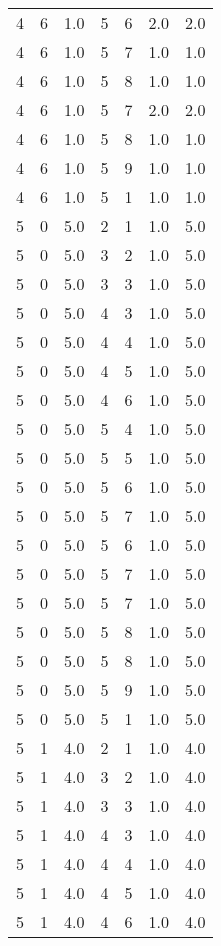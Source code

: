 \documentclass[a4paper,12pt]{article}
\begin{document}
\begin{center}
\begin{longtable}{ c c c | c c c | c }
        4 & 6 & 1.0 & 5 & 6 & 2.0 & 2.0 \\
        4 & 6 & 1.0 & 5 & 7 & 1.0 & 1.0 \\
        4 & 6 & 1.0 & 5 & 8 & 1.0 & 1.0 \\
        4 & 6 & 1.0 & 5 & 7 & 2.0 & 2.0 \\
        4 & 6 & 1.0 & 5 & 8 & 1.0 & 1.0 \\
        4 & 6 & 1.0 & 5 & 9 & 1.0 & 1.0 \\
        4 & 6 & 1.0 & 5 & 1 & 1.0 & 1.0 \\
        5 & 0 & 5.0 & 2 & 1 & 1.0 & 5.0 \\
        5 & 0 & 5.0 & 3 & 2 & 1.0 & 5.0 \\
        5 & 0 & 5.0 & 3 & 3 & 1.0 & 5.0 \\
        5 & 0 & 5.0 & 4 & 3 & 1.0 & 5.0 \\
        5 & 0 & 5.0 & 4 & 4 & 1.0 & 5.0 \\
        5 & 0 & 5.0 & 4 & 5 & 1.0 & 5.0 \\
        5 & 0 & 5.0 & 4 & 6 & 1.0 & 5.0 \\
        5 & 0 & 5.0 & 5 & 4 & 1.0 & 5.0 \\
        5 & 0 & 5.0 & 5 & 5 & 1.0 & 5.0 \\
        5 & 0 & 5.0 & 5 & 6 & 1.0 & 5.0 \\
        5 & 0 & 5.0 & 5 & 7 & 1.0 & 5.0 \\
        5 & 0 & 5.0 & 5 & 6 & 1.0 & 5.0 \\
        5 & 0 & 5.0 & 5 & 7 & 1.0 & 5.0 \\
        5 & 0 & 5.0 & 5 & 7 & 1.0 & 5.0 \\
        5 & 0 & 5.0 & 5 & 8 & 1.0 & 5.0 \\
        5 & 0 & 5.0 & 5 & 8 & 1.0 & 5.0 \\
        5 & 0 & 5.0 & 5 & 9 & 1.0 & 5.0 \\
        5 & 0 & 5.0 & 5 & 1 & 1.0 & 5.0 \\
        5 & 1 & 4.0 & 2 & 1 & 1.0 & 4.0 \\
        5 & 1 & 4.0 & 3 & 2 & 1.0 & 4.0 \\
        5 & 1 & 4.0 & 3 & 3 & 1.0 & 4.0 \\
        5 & 1 & 4.0 & 4 & 3 & 1.0 & 4.0 \\
        5 & 1 & 4.0 & 4 & 4 & 1.0 & 4.0 \\
        5 & 1 & 4.0 & 4 & 5 & 1.0 & 4.0 \\
        5 & 1 & 4.0 & 4 & 6 & 1.0 & 4.0 \\

\end{longtable}
\end{center}
\end{document}
